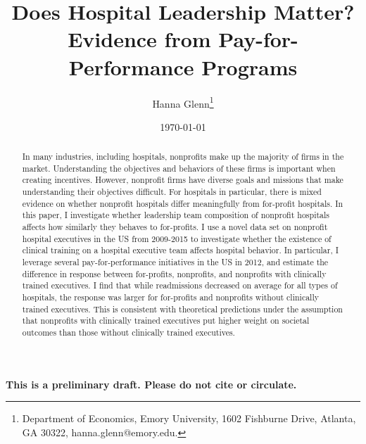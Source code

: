 \documentclass[12pt]{article}
\begin{document}
	
	
	
	
	\linespread{1.2}\title{\vspace{-0.5in} Does Hospital Leadership Matter?\\ \large Evidence from Pay-for-Performance Programs} 
	
	\date{\today}
	
	\author{\vspace{10mm}Hanna Glenn\footnote{Department of Economics, Emory University, 1602 Fishburne Drive, Atlanta, GA 30322, hanna.glenn@emory.edu.} }
	
	\maketitle
	
	\vspace{-0.2in}
	
	\singlespacing\maketitle

    \begin{center}
    \large
    \textbf{This is a preliminary draft. Please do not cite or circulate.}
	\end{center}

 \vspace{3mm}
	
    \begin{abstract}
		{\small
        In many industries, including hospitals, nonprofits make up the majority of firms in the market. Understanding the objectives and behaviors of these firms is important when creating incentives. However, nonprofit firms have diverse goals and missions that make understanding their objectives difficult. For hospitals in particular, there is mixed evidence on whether nonprofit hospitals differ meaningfully from for-profit hospitals. In this paper, I investigate whether leadership team composition of nonprofit hospitals affects how similarly they behaves to for-profits. I use a novel data set on nonprofit hospital executives in the US from 2009-2015 to investigate whether the existence of clinical training on a hospital executive team affects hospital behavior. In particular, I leverage several pay-for-performance initiatives in the US in 2012, and estimate the difference in response between for-profits, nonprofits, and nonprofits with clinically trained executives. I find that while readmissions decreased on average for all types of hospitals, the response was larger for for-profits and nonprofits without clinically trained executives. This is consistent with theoretical predictions under the assumption that nonprofits with clinically trained executives put higher weight on societal outcomes than those without clinically trained executives.
		} 
	\end{abstract}
	
\end{document}
